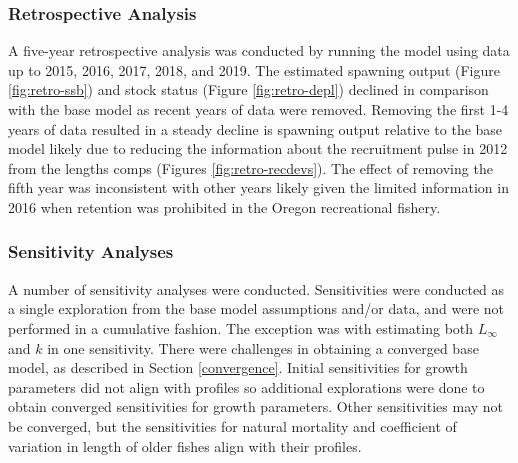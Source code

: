 \documentclass[11pt,
  english,
  a4paper,
]{article}
\begin{document}
\leavevmode\tagmcend\tagstructend\par


\hypertarget{retrospective-analysis}{%
\subsubsection{Retrospective Analysis}\label{retrospective-analysis}}

\leavevmode\tagmcend\tagstructend


A five-year retrospective analysis was conducted by running the model using data up to 2015, 2016, 2017, 2018, and 2019. The estimated spawning output (Figure \ref{fig:retro-ssb}) and stock status (Figure \ref{fig:retro-depl}) declined in comparison with the base model as recent years of data were removed. Removing the first 1-4 years of data resulted in a steady decline is spawning output relative to the base model likely due to reducing the information about the recruitment pulse in 2012 from the lengths comps (Figures \ref{fig:retro-recdevs}). The effect of removing the fifth year was inconsistent with other years likely given the limited information in 2016 when retention was prohibited in the Oregon recreational fishery.

\leavevmode\tagmcend\tagstructend\par


\hypertarget{sensitivity-analyses}{%
\subsubsection{Sensitivity Analyses}\label{sensitivity-analyses}}

\leavevmode\tagmcend\tagstructend


A number of sensitivity analyses were conducted. Sensitivities were conducted as a single exploration from the base model assumptions and/or data, and were not performed in a cumulative fashion. The exception was with estimating both {\(L_{\infty}\)\leavevmode\tagmcend\tagstructend} and {\(k\)\leavevmode\tagmcend\tagstructend} in one sensitivity. There were challenges in obtaining a converged base model, as described in Section \ref{convergence}. Initial sensitivities for growth parameters did not align with profiles so additional explorations were done to obtain converged sensitivities for growth parameters. Other sensitivities may not be converged, but the sensitivities for natural mortality and coefficient of variation in length of older fishes align with their profiles.
\end{document}
